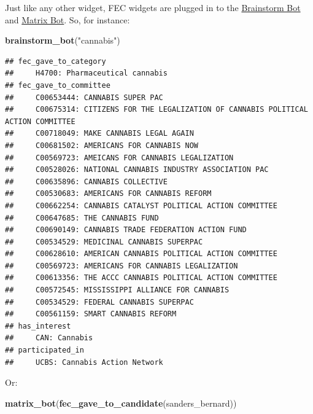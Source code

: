 \documentclass[]{book}
\newenvironment{Shaded}{\begin{snugshade}}{\end{snugshade}}
\newcommand{\KeywordTok}[1]{\textcolor[rgb]{0.13,0.29,0.53}{\textbf{#1}}}
\newcommand{\NormalTok}[1]{#1}
\newcommand{\StringTok}[1]{\textcolor[rgb]{0.31,0.60,0.02}{#1}}
\begin{document}
Just like any other widget, FEC widgets are plugged in to the \protect\hyperlink{brainstorm-bot}{Brainstorm Bot} and \protect\hyperlink{matrix-bot}{Matrix Bot}. So, for instance:

\begin{Shaded}
\begin{Highlighting}[]
\KeywordTok{brainstorm_bot}\NormalTok{(}\StringTok{"cannabis"}\NormalTok{)}
\end{Highlighting}
\end{Shaded}

\begin{verbatim}
## fec_gave_to_category 
##     H4700: Pharmaceutical cannabis
## fec_gave_to_committee 
##     C00653444: CANNABIS SUPER PAC
##     C00675314: CITIZENS FOR THE LEGALIZATION OF CANNABIS POLITICAL ACTION COMMITTEE
##     C00718049: MAKE CANNABIS LEGAL AGAIN
##     C00681502: AMERICANS FOR CANNABIS NOW
##     C00569723: AMEICANS FOR CANNABIS LEGALIZATION
##     C00528026: NATIONAL CANNABIS INDUSTRY ASSOCIATION PAC
##     C00635896: CANNABIS COLLECTIVE
##     C00530683: AMERICANS FOR CANNABIS REFORM
##     C00662254: CANNABIS CATALYST POLITICAL ACTION COMMITTEE
##     C00647685: THE CANNABIS FUND
##     C00690149: CANNABIS TRADE FEDERATION ACTION FUND
##     C00534529: MEDICINAL CANNABIS SUPERPAC
##     C00628610: AMERICAN CANNABIS POLITICAL ACTION COMMITTEE
##     C00569723: AMERICANS FOR CANNABIS LEGALIZATION
##     C00613356: THE ACCC CANNABIS POLITICAL ACTION COMMITTEE
##     C00572545: MISSISSIPPI ALLIANCE FOR CANNABIS
##     C00534529: FEDERAL CANNABIS SUPERPAC
##     C00561159: SMART CANNABIS REFORM
## has_interest 
##     CAN: Cannabis
## participated_in 
##     UCBS: Cannabis Action Network
\end{verbatim}

Or:

\begin{Shaded}
\begin{Highlighting}[]
\KeywordTok{matrix_bot}\NormalTok{(}\KeywordTok{fec_gave_to_candidate}\NormalTok{(sanders_bernard))}
\end{Highlighting}
\end{Shaded}
\end{document}
